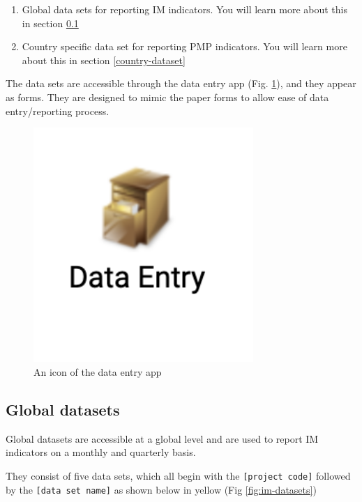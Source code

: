 \documentclass[]{book}
\providecommand{\tightlist}{%
  \setlength{\itemsep}{0pt}\setlength{\parskip}{0pt}}
\begin{document}
\begin{enumerate}
\def\labelenumi{\arabic{enumi}.}
\tightlist
\item
  Global data sets for reporting IM indicators. You will learn more about this in section \ref{global-dataset}
\item
  Country specific data set for reporting PMP indicators. You will learn more about this in section \ref{country-dataset}
\end{enumerate}

The data sets are accessible through the data entry app (Fig. \ref{fig:data-entry-app}), and they appear as forms. They are designed to mimic the paper forms to allow ease of data entry/reporting process.

\begin{figure}
\includegraphics[width=3.28in]{./images/data-entry-app} \caption{An icon of the data entry app}\label{fig:data-entry-app}
\end{figure}

\hypertarget{global-dataset}{%
\subsection{Global datasets}\label{global-dataset}}

Global datasets are accessible at a global level and are used to report IM indicators on a monthly and quarterly basis.

They consist of five data sets, which all begin with the \texttt{{[}project\ code{]}} followed by the \texttt{{[}data\ set\ name{]}} as shown below in yellow (Fig \ref{fig:im-datasets})
\end{document}
